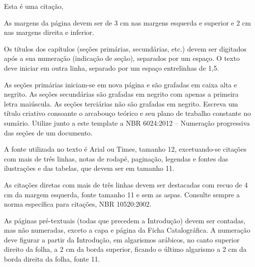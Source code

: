 \begin{citacao}
    Esta é uma citação, \lipsum[20]
\end{citacao}

As margens da página devem ser de 3 cm nas margens esquerda e superior e 2 cm nas margens direita e inferior.

Os títulos dos capítulos (seções primárias, secundárias, etc.) devem ser digitados após a sua numeração (indicação de seção), separados por um espaço. O texto deve iniciar em outra linha, separado por um espaço entrelinhas de 1,5. 

As seções primárias iniciam-se em nova página e são grafadas em caixa alta e negrito. As seções secundárias são grafadas em negrito com apenas a primeira letra maiúscula. As seções terciárias não são grafadas em negrito. Escreva um título criativo consoante o arcabouço teórico e seu plano de trabalho constante no sumário. Utilize junto a este template a NBR 6024:2012 – Numeração progressiva das seções de um documento.

A fonte utilizada no texto é Arial ou Times, tamanho 12, excetuando-se citações com mais de três linhas, notas de rodapé, paginação, legendas e fontes das ilustrações e das tabelas, que devem ser em tamanho 11. 

As citações diretas com mais de três linhas devem ser destacadas com recuo de 4 cm da margem esquerda, fonte tamanho 11 e sem as aspas. Consulte sempre a norma específica para citações, NBR 10520:2002.

As páginas pré-textuais (todas que precedem a Introdução) devem ser contadas, mas não numeradas, exceto a capa e página da Ficha Catalográfica. A numeração deve figurar a partir da Introdução, em algarismos arábicos, no canto superior direito da folha, a 2 cm da borda superior, ficando o último algarismo a 2 cm da borda direita da folha, fonte 11.


% 